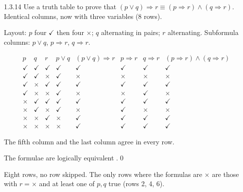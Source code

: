 \begin{bookex}[essential]{1.3.14}
Use a truth table to prove that $(p\vee q)\Rightarrow r\equiv(p\Rightarrow r)\wedge(q\Rightarrow r)$.
\solution
\goal Identical columns, now with three variables ($8$ rows).
\begin{steps}
\item Layout: $p$ four $\checkmark$ then four $\times$; $q$ alternating in pairs; $r$ alternating. Subformula columns: $p\vee q$, $p\Rightarrow r$, $q\Rightarrow r$.
\item
\[
\begin{array}{ccc|cc|ccc}
p&q&r&p\vee q&(p\vee q)\Rightarrow r&p\Rightarrow r&q\Rightarrow r&(p\Rightarrow r)\wedge(q\Rightarrow r)\\\hline
\checkmark&\checkmark&\checkmark&\checkmark&\checkmark&\checkmark&\checkmark&\checkmark\\
\checkmark&\checkmark&\times&\checkmark&\times&\times&\times&\times\\
\checkmark&\times&\checkmark&\checkmark&\checkmark&\checkmark&\checkmark&\checkmark\\
\checkmark&\times&\times&\checkmark&\times&\times&\checkmark&\times\\
\times&\checkmark&\checkmark&\checkmark&\checkmark&\checkmark&\checkmark&\checkmark\\
\times&\checkmark&\times&\checkmark&\times&\checkmark&\times&\times\\
\times&\times&\checkmark&\times&\checkmark&\checkmark&\checkmark&\checkmark\\
\times&\times&\times&\times&\checkmark&\checkmark&\checkmark&\checkmark
\end{array}
\]
\item The fifth column and the last column agree in every row.
\end{steps}
\conclusion The formulae are logically equivalent .\qed
\begin{compare}
\item Eight rows, no row skipped. The only rows where the formulas are $\times$ are those with $r=\times$ and at least one of $p,q$ true (rows 2, 4, 6).
\end{compare}
\end{bookex}

